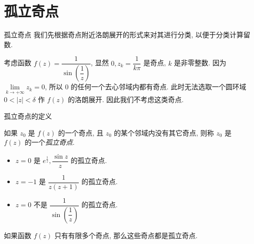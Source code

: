 \section{孤立奇点}


\begin{frame}{孤立奇点}
\onslide<+->
我们先根据奇点附近洛朗展开的形式来对其进行分类, 以便于分类计算留数.
\begin{example}
考虑函数 $f(z)=\dfrac1{\sin\left(\dfrac1z\right)}$, 显然 $0,z_k=\dfrac1{k\pi}$ 是奇点, $k$ 是非零整数.
\onslide<+->
因为 $\lim\limits_{k\to+\infty} z_k=0$, 所以 $0$ 的任何一个去心邻域内都有奇点.
\onslide<+->
此时无法选取一个圆环域 $0<|z|<\delta$ 作 $f(z)$ 的洛朗展开.
\onslide<+->
因此我们不考虑这类奇点.
\vspace{-9pt}
\begin{center}
\end{center}
\vspace{-7pt}
\end{example}
\end{frame}


\begin{frame}{孤立奇点的定义}
\begin{definition}
如果 $z_0$ 是 $f(z)$ 的一个奇点, 且 $z_0$ 的某个邻域内没有其它奇点, 则称 $z_0$ 是 $f(z)$ 的一个\emph{孤立奇点}.
\end{definition}
\begin{example}
\begin{itemize}
\item $z=0$ 是 $e^{\frac1z},\dfrac{\sin z}z$ 的孤立奇点.
\item $z=-1$ 是 $\dfrac1{z(z+1)}$ 的孤立奇点.
\item $z=0$ 不是 $\dfrac1{\sin\left(\dfrac1z\right)}$ 的孤立奇点.
\end{itemize}
\end{example}
\onslide<+->
如果函数 $f(z)$ 只有有限多个奇点, 那么这些奇点都是孤立奇点.
\end{frame}


